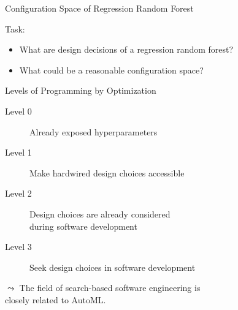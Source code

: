\begin{frame}{Configuration Space of Regression Random Forest}

Task: \hands [5min]
\begin{itemize}
  \item What are design decisions of a regression random forest?
  \item What could be a reasonable configuration space?  
\end{itemize}

\end{frame}
\begin{frame}[c]{Levels of Programming by Optimization }

\begin{description}
\item[Level 0] Already exposed hyperparameters
\pause
\item[Level 1] Make hardwired design choices accessible
\pause
\item[Level 2] Design choices are already considered\\ during software development
\pause 
\item[Level 3] Seek design choices in software development
\end{description}

\pause
\bigskip

$\leadsto$ The field of search-based software engineering is\\ closely related to AutoML.

\end{frame}
